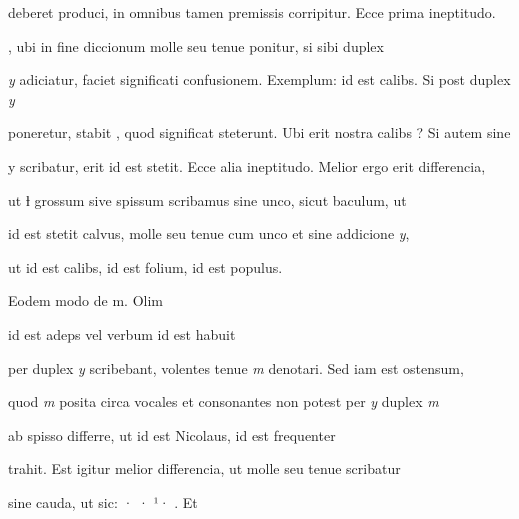 deberet produci, in omnibus tamen premissis corripitur. Ecce prima ineptitudo. 

, ubi in fine diccionum  molle seu tenue ponitur, si sibi duplex

\textit{y} adiciatur, faciet significati confusionem. Exemplum:  id est calibs. Si post  duplex \textit{y}

poneretur, stabit , quod significat steterunt. Ubi erit nostra calibs ? Si autem sine 

y scribatur, erit  id est stetit.  Ecce alia ineptitudo. Melior ergo erit differencia,

ut ƚ grossum sive spissum scribamus sine unco, sicut baculum, ut  

 id est stetit calvus,  molle seu tenue cum unco et sine addicione \textit{y}, 

\splitlines
ut  id est calibs,  id est folium,  id est populus.

\indentK Eodem modo de \textmd{m}. Olim 

\fulllines
{}    id est adeps vel verbum id est habuit

per duplex \textit{y} scribebant, volentes tenue \textit{m} denotari. Sed iam est ostensum,

quod \textit{m} posita circa vocales et consonantes non potest per \textit{y} duplex \textit{m} 

 ab  spisso differre, ut  id est Nicolaus,  id est frequenter

trahit. Est igitur melior differencia, ut  molle seu tenue scribatur

sine cauda, ut sic: · · ¹·  . Et


\endinput



\newcommand{\margin}[1]{\annotatetextBlue{\{#1\}}{zapisy na marginesie}}



\renewcommand{\over}[1]{\annotatetextBlue{\{#1\}}{zapisy nad rządkami}}

